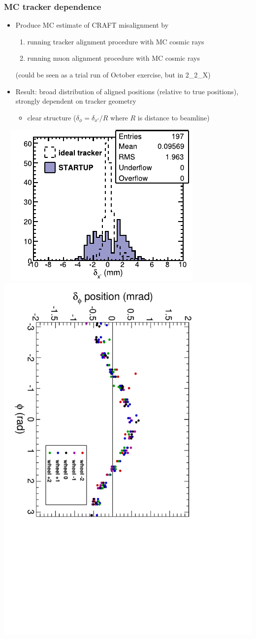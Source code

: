 \documentclass[compress]{beamer}
\begin{document}
\begin{frame}
\frametitle{MC tracker dependence}
\begin{itemize}
\item Produce MC estimate of CRAFT misalignment by
\begin{enumerate}
\item running tracker alignment procedure with MC cosmic rays
\item running muon alignment procedure with MC cosmic rays
\end{enumerate}
(could be seen as a trial run of October exercise, but in 2\_2\_X)

\item Result: broad distribution of aligned positions (relative to true positions), strongly dependent on tracker geometry
\begin{itemize}
\item clear structure ($\delta_\phi = \delta_{x'} / R$ where $R$ is distance to beamline)
\end{itemize}
\end{itemize}

\mbox{ } \hfill \includegraphics[height=4 cm]{startup_6dof_redo.pdf} \hfill
\includegraphics[width=4 cm, angle=90]{startup_phi_phi_redo.pdf} \hfill \mbox{ }
\end{frame}
\end{document}
